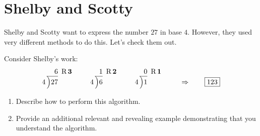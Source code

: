 \newpage
\section{Shelby and Scotty}\label{A:SS}

Shelby and Scotty want to express the number $27$ in base
$4$. However, they used very different methods to do this. Let's check
them out.





\begin{prob} Consider Shelby's work:
\[
4\,\begin{tabular}[b]{@{}r@{} r}
$6$ &\, R\,$\boldsymbol{3}$\\ \cline{1-1}
\Big)\begin{tabular}[t]{@{}l@{}}
$27$ 
\end{tabular}
\end{tabular}
\qquad
4\,\begin{tabular}[b]{@{}r@{} r}
$1$ &\, R\,$\boldsymbol{2}$\\ \cline{1-1}
\Big)\begin{tabular}[t]{@{}l@{}}
$6$ 
\end{tabular}
\end{tabular}
\qquad
4\,\begin{tabular}[b]{@{}r@{} r}
$0$ &\, R\,$\boldsymbol{1}$\\ \cline{1-1}
\Big)\begin{tabular}[t]{@{}l@{}}
$1$ 
\end{tabular}
\end{tabular} \qquad \Rightarrow \qquad \fbox{$123$}
\]
\begin{enumerate}
\item Describe how to perform this algorithm.
\item Provide an additional relevant and revealing example
  demonstrating that you understand the algorithm.
\end{enumerate}
\end{prob}





